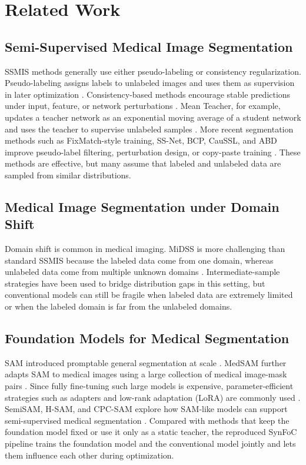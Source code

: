 \section{Related Work}
\subsection{Semi-Supervised Medical Image Segmentation}
SSMIS methods generally use either pseudo-labeling or consistency regularization. Pseudo-labeling assigns labels to unlabeled images and uses them as supervision in later optimization \cite{lee2013pseudo}. Consistency-based methods encourage stable predictions under input, feature, or network perturbations \cite{chen2021semi}. Mean Teacher, for example, updates a teacher network as an exponential moving average of a student network and uses the teacher to supervise unlabeled samples \cite{tarvainen2017mean,yu2019uncertainty}. More recent segmentation methods such as FixMatch-style training, SS-Net, BCP, CauSSL, and ABD improve pseudo-label filtering, perturbation design, or copy-paste training \cite{sohn2020fixmatch,upretee2022fixmatchseg,wu2022exploring,bai2023bidirectional,miao2023caussl,chi2024adaptive}. These methods are effective, but many assume that labeled and unlabeled data are sampled from similar distributions.

\subsection{Medical Image Segmentation under Domain Shift}
Domain shift is common in medical imaging. MiDSS is more challenging than standard SSMIS because the labeled data come from one domain, whereas unlabeled data come from multiple unknown domains \cite{ma2024constructing}. Intermediate-sample strategies have been used to bridge distribution gaps in this setting, but conventional models can still be fragile when labeled data are extremely limited or when the labeled domain is far from the unlabeled domains.

\subsection{Foundation Models for Medical Segmentation}
SAM introduced promptable general segmentation at scale \cite{kirillov2023segment}. MedSAM further adapts SAM to medical images using a large collection of medical image-mask pairs \cite{ma2024segment}. Since fully fine-tuning such large models is expensive, parameter-efficient strategies such as adapters and low-rank adaptation (LoRA) are commonly used \cite{hu2021lora,zhang2023customized}. SemiSAM, H-SAM, and CPC-SAM explore how SAM-like models can support semi-supervised medical segmentation \cite{zhang2023semisam,cheng2024unleashing,miao2024cross}. Compared with methods that keep the foundation model fixed or use it only as a static teacher, the reproduced SynFoC pipeline trains the foundation model and the conventional model jointly and lets them influence each other during optimization.
